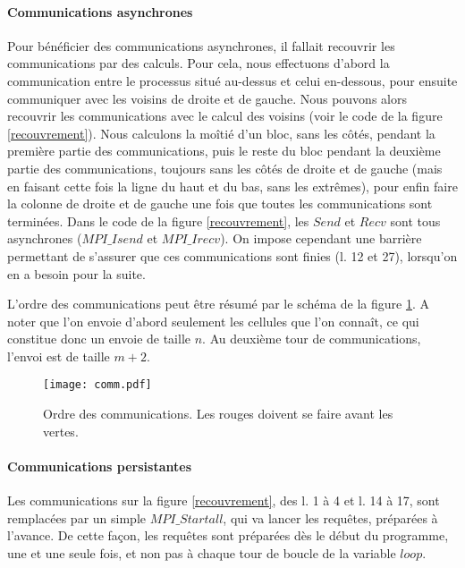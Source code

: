 \paragraph{Communications asynchrones}
Pour bénéficier des communications asynchrones, il fallait recouvrir les communications par des calculs. Pour cela, nous effectuons d'abord la communication entre le processus situé au-dessus et celui en-dessous, pour ensuite communiquer avec les voisins de droite et de gauche. Nous pouvons alors recouvrir les communications avec le calcul des voisins (voir le code de la figure \ref{recouvrement}). 
Nous calculons la moîtié d'un bloc, sans les côtés, pendant la première partie des communications, puis le reste du bloc pendant la deuxième partie des communications, toujours sans les côtés de droite et de gauche (mais en faisant cette fois la ligne du haut et du bas, sans les extrêmes), pour enfin faire la colonne de droite et de gauche une fois que toutes les communications sont terminées. 
Dans le code de la figure \ref{recouvrement}, les $Send$ et $Recv$ sont tous asynchrones ($MPI\_Isend$ et $MPI\_Irecv$). On impose cependant une barrière permettant de s'assurer que ces communications sont finies (l. 12 et 27), lorsqu'on en a besoin pour la suite.

L'ordre des communications peut être résumé par le schéma de la figure \ref{fig:comm}. A noter que l'on envoie d'abord seulement les cellules que l'on connaît, ce qui constitue donc un envoie de taille $n$. Au deuxième tour de communications, l'envoi est de taille $m+2$.

\begin{figure}[!ht]
\centering
\texttt{[image: comm.pdf]}
\caption{Ordre des communications. Les rouges doivent se faire avant les vertes.}
\label{fig:comm}
\end{figure}

\paragraph{Communications persistantes}
Les communications sur la figure \ref{recouvrement}, des l. 1 à 4 et l. 14 à 17, sont remplacées par un simple $MPI\_Startall$, qui va lancer les requêtes, préparées à l'avance. De cette façon, les requêtes sont préparées dès le début du programme, une et une seule fois, et non pas à chaque tour de boucle de la variable $loop$. 
